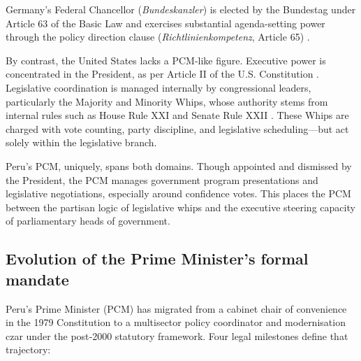 \documentclass[a4paper, 12pt]{article}
\begin{document}
Germany’s Federal Chancellor (\textit{Bundeskanzler}) is elected by the Bundestag under Article 63 of the Basic Law and exercises substantial agenda-setting power through the policy direction clause (\textit{Richtlinienkompetenz}, Article 65) \citep{federal_republic_of_germany_grundgesetz_1949}.

By contrast, the United States lacks a PCM-like figure. Executive power is concentrated in the President, as per Article II of the U.S. Constitution \citep{united_states_of_america_constitution_1787}. Legislative coordination is managed internally by congressional leaders, particularly the Majority and Minority Whips, whose authority stems from internal rules such as House Rule XXI and Senate Rule XXII \citep{us_house_of_representatives_rules_2023,us_senate_standing_2023}. These Whips are charged with vote counting, party discipline, and legislative scheduling—but act solely within the legislative branch.

Peru's PCM, uniquely, spans both domains. Though appointed and dismissed by the President, the PCM manages government program presentations and legislative negotiations, especially around confidence votes. This places the PCM between the partisan logic of legislative whips and the executive steering capacity of parliamentary heads of government.


\subsection{Evolution of the Prime Minister’s formal mandate} Peru’s Prime Minister (PCM) has migrated from a cabinet chair of convenience in the 1979 Constitution to a multisector policy coordinator and modernisation czar under the post‑2000 statutory framework.  Four legal milestones define that trajectory:
\end{document}

